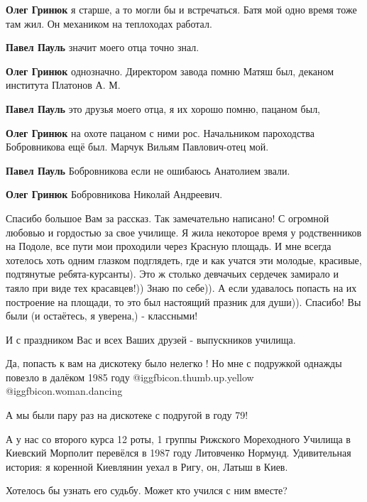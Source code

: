 \begin{itemize}
\begin{itemize}
\textbf{Олег Гринюк} я старше, а то могли бы и встречаться. Батя мой одно время тоже там жил. Он механиком на теплоходах работал.

\textbf{Павел Пауль} значит моего отца точно знал.

\textbf{Олег Гринюк} однозначно. Директором завода помню Матяш был, деканом института Платонов А. М.

\textbf{Павел Пауль} это друзья моего отца, я их хорошо помню, пацаном был,

\textbf{Олег Гринюк} на охоте пацаном с ними рос. Начальником пароходства Бобровникова ещё был. Марчук Вильям Павлович-отец мой.

\textbf{Павел Пауль} Бобровникова если не ошибаюсь Анатолием звали.

\textbf{Олег Гринюк} Бобровникова Николай Андреевич.
\end{itemize} %


Спасибо большое Вам за рассказ. Так замечательно написано! С огромной любовью и
гордостью за свое училище. Я жила некоторое время у родственников на Подоле,
все пути мои проходили через Красную площадь. И мне всегда хотелось хоть одним
глазком подглядеть, где и как учатся эти молодые, красивые, подтянутые
ребята-курсанты). Это ж столько девчачьих сердечек замирало и таяло при виде
тех красавцев!)) Знаю по себе)). А если удавалось попасть на их построение на
площади, то это был настоящий празник для души)). Спасибо! Вы были (и
остаётесь, я уверена,) - классными!

И с праздником Вас и всех Ваших друзей - выпускников училища.


Да, попасть к вам на дискотеку было нелегко ! Но мне с подружкой однажды
повезло в далёком 1985 году @igg{fbicon.thumb.up.yellow}  @igg{fbicon.woman.dancing} 

А мы были пару раз на дискотеке с подругой в году 79!


А у нас со второго курса 12 роты, 1 группы Рижского Мореходного Училища в
Киевский Морполит перевёлся в 1987 году Литовченко Нормунд. Удивительная
история: я коренной Киевлянин уехал в Ригу, он, Латыш в Киев.

Хотелось бы узнать его судьбу. Может кто учился с ним вместе?



\end{itemize}

